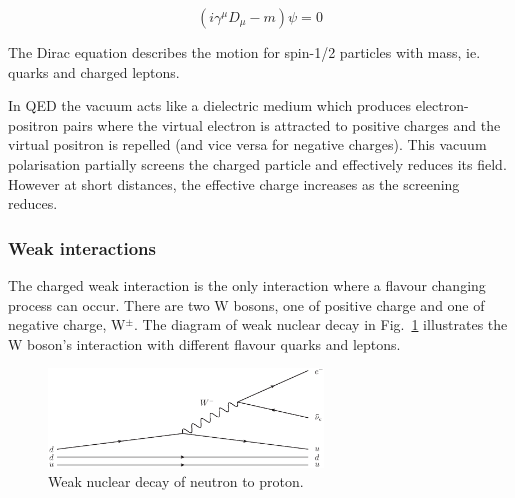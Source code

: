 
\begin{equation}
\left( i\gamma^{\mu} D_{\mu} - m \right)\psi = 0
\label{Eqn:Dirac}
\end{equation}


The Dirac equation describes the motion for spin-1/2 particles with mass, ie. quarks and charged leptons.



In QED the vacuum acts like a dielectric medium which produces electron-positron pairs where the virtual electron is attracted to positive charges and the virtual positron is repelled (and vice versa for negative charges). This vacuum polarisation partially screens the charged particle and effectively reduces its field. However at short distances, the effective charge increases as the screening reduces.

\subsubsection{Weak interactions}

The charged weak interaction is the only interaction where a flavour changing process can occur. There are two W bosons, one of positive charge and one of negative charge, W$^{\pm}$. The diagram of weak nuclear decay in Fig.~\ref{fig:QEDvertex} illustrates the W boson's interaction with different flavour quarks and leptons.


\begin{figure}[ht!]
\begin{center}
    \includegraphics[width=0.65\textwidth]{images/Theory/weakDecay2.eps}
    \caption{Weak nuclear decay of neutron to proton.}
    \label{fig:QEDvertex}
\end{center}
\end{figure}

